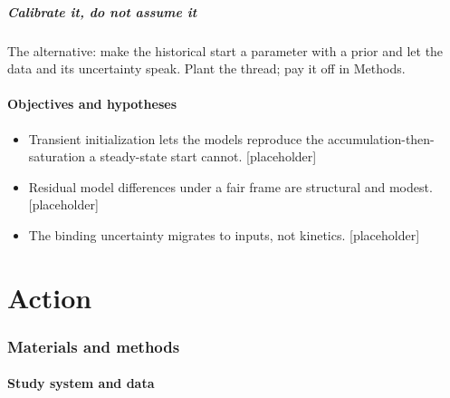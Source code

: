 \documentclass[11pt]{article}
\begin{document}
\subsubsection{Calibrate it, do not assume it}
The alternative: make the historical start a parameter with a prior and let
the data and its uncertainty speak. Plant the thread; pay it off in Methods.

\subsection{Objectives and hypotheses}
\begin{itemize}
  \item[H1] Transient initialization lets the models reproduce the
        accumulation-then-saturation a steady-state start cannot. [placeholder]
  \item[H2] Residual model differences under a fair frame are structural and
        modest. [placeholder]
  \item[H3] The binding uncertainty migrates to inputs, not kinetics.
        [placeholder]
\end{itemize}

\part{Action}

\section{Materials and methods}

\subsection{Study system and data}
\end{document}
